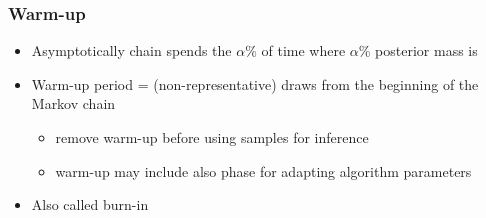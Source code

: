 \documentclass[10pt]{beamer}
\begin{document}
\begin{frame}

\frametitle{Warm-up}

  \begin{itemize}
  \item Asymptotically chain spends the $\alpha$\% of time where
    $\alpha$\% posterior mass is
      \vspace{-.5\baselineskip}
    \item<3-> Warm-up period = (non-representative) draws from the beginning of the Markov chain
    \begin{itemize}
      \item remove warm-up before using samples for inference
      \item warm-up may include also phase for adapting algorithm parameters
      \end{itemize}
    \item<4-> Also called {\color{uured} burn-in}
  \end{itemize}

\end{frame}
\end{document}
